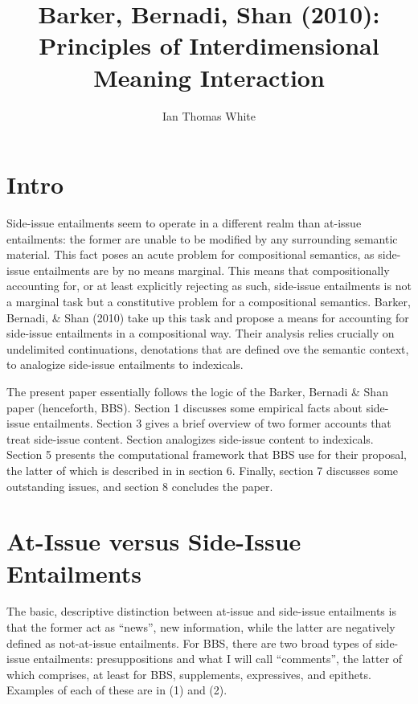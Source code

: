 \documentclass[12pt]{article}
\title{Barker, Bernadi, Shan (2010): \\ Principles of Interdimensional Meaning Interaction}
\author{Ian Thomas White}
\date{}
\makeatletter
\renewcommand{\maketitle}
{
\begin{flushleft}
\textbf{{\large\@title}}
\newline
\@author
\end{flushleft}
}
\makeatother
\begin{document}
\thispagestyle{empty}
\maketitle
\tableofcontents
\newpage

\section{Intro}

Side-issue entailments seem to operate in a different realm than at-issue entailments: the former are unable to be modified by any surrounding semantic material. This fact poses an acute problem for compositional semantics, as side-issue entailments are by no means marginal. This means that compositionally accounting for, or at least explicitly rejecting as such, side-issue entailments is not a marginal task but a constitutive problem for a compositional semantics. Barker, Bernadi, \& Shan (2010) take up this task and propose a means for accounting for side-issue entailments in a compositional way. Their analysis relies crucially on undelimited continuations, denotations that are defined ove the semantic context, to analogize side-issue entailments to indexicals.

The present paper essentially follows the logic of the Barker, Bernadi \& Shan paper (henceforth, BBS). Section 1 discusses some empirical facts about side-issue entailments. Section 3 gives a brief overview of two former accounts that treat side-issue content. Section analogizes side-issue content to indexicals. Section 5 presents the computational framework that BBS use for their proposal, the latter of which is described in in section 6. Finally, section 7 discusses some outstanding issues, and section 8 concludes the paper.

\section{At-Issue versus Side-Issue Entailments}

The basic, descriptive distinction between at-issue and side-issue entailments is that the former act as ``news'', new information, while the latter are negatively defined as not-at-issue entailments. For BBS, there are two broad types of side-issue entailments: presuppositions and what I will call ``comments'', the latter of which comprises, at least for BBS, supplements, expressives, and epithets. Examples of each of these are in (1) and (2).
    
\end{document}
